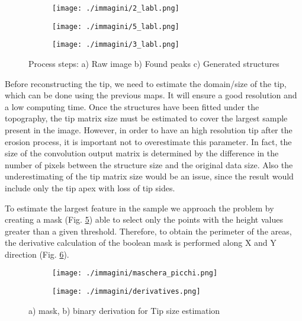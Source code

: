 \begin{figure}[ht]
    \centering
    \begin{subfigure}[b]{0.325\textwidth}
        \texttt{[image: ./immagini/2\_labl.png]}
        \caption{}
        \label{fig:process_steps_a}
    \end{subfigure}
    \hfill
    \begin{subfigure}[b]{0.325\textwidth}
        \texttt{[image: ./immagini/5\_labl.png]}
        \caption{}
        \label{fig:process_steps_b}
    \end{subfigure}
    \hfill
    \begin{subfigure}[b]{0.325\textwidth}
        \texttt{[image: ./immagini/3\_labl.png]}
        \caption{}
        \label{fig:process_steps_c}
    \end{subfigure}
    \caption{Process steps: a) Raw image b) Found peaks c) Generated structures}
    \label{fig:process_steps}
\end{figure}


Before reconstructing the tip, we need to estimate the domain/size of the tip, which can be done using the previous maps. It will ensure a good resolution and a low computing time. Once the structures have been fitted under the topography, the tip matrix size must be estimated to cover the largest sample present in the image. However, in order to have an high resolution tip after the erosion process, it is important not to overestimate this parameter. In fact, the size of the convolution output matrix is determined by the difference in the number of pixels between the structure size and the original data size. Also the underestimating of the tip matrix size would be an issue, since the result would include only the tip apex with loss of tip sides.

To estimate the largest feature in the sample we approach the problem by creating a mask (Fig. \ref{fig:boolean_a}) able to select only the points with the height values greater than a given threshold. Therefore, to obtain the perimeter of the areas, the derivative calculation of the boolean mask is performed along X and Y direction (Fig. \ref{fig:boolean_b}).

\newpage

\begin{figure}[ht]
    \centering
    \begin{subfigure}[b]{0.45\textwidth}
        \texttt{[image: ./immagini/maschera\_picchi.png]}
        \caption{}
        \label{fig:boolean_a}
    \end{subfigure}
    \hfill
    \begin{subfigure}[b]{0.45\textwidth}
        \texttt{[image: ./immagini/derivatives.png]}
        \caption{}
        \label{fig:boolean_b}
    \end{subfigure}
    \caption{a) mask, b)  binary derivation for Tip size estimation}
    \label{fig:boolean}
\end{figure}

